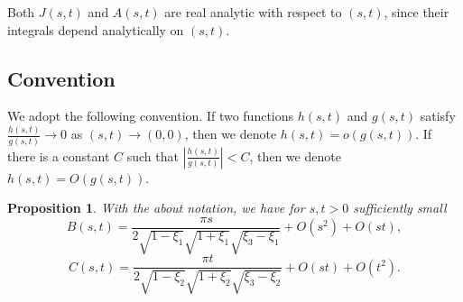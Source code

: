 \documentclass[11pt]{amsart}
\theoremstyle{plain}
\newtheorem{Proposition}[Theorem]{Proposition}
\begin{document}
Both $J(s,t)$ and $A(s,t)$ are real analytic with respect to $(s,t)$,
 since their integrals depend analytically on $(s,t)$.
 
 \subsection*{Convention} We adopt the following convention. If two functions $h(s,t)$ and $g(s,t)$ satisfy $\frac{h(s,t)}{g(s,t)} \to 0$ as $(s,t)\to (0,0)$,
 then we denote $h(s,t)=o\left(g(s,t)\right)$.
 If there is a constant $C$ such that $\left|\frac{h(s,t)}{g(s,t)}\right| < C$, then
we denote $h(s,t)=O\left(g(s,t)\right)$.
 
\begin{Proposition}\label{prop:B-C}
With the about notation, we have for $s,t>0$ sufficiently small
    $$B(s,t)=\frac{\pi s}{2\sqrt{1-\xi_1}\sqrt{1+\xi_1}\sqrt{\xi_3-\xi_1}} +O(s^2)+O(st),$$
    $$C(s,t)=\frac{\pi t}{2\sqrt{1-\xi_2}\sqrt{1+\xi_2}\sqrt{\xi_3-\xi_2}}  +O(st)+ O(t^2).$$
\end{Proposition}
\end{document}
